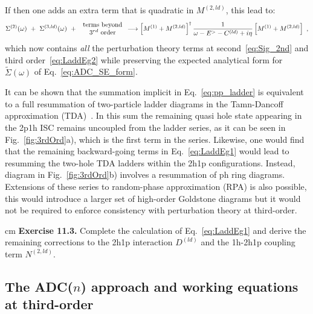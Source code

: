 If then one adds an extra term that is quadratic in  $M^{(2,ld)}$, this lead to:
\begin{equation}
  \Sigma^{(2)}(\omega)  ~+~ \Sigma^{(3, ld)}(\omega) ~+~ \begin{array}{c} \hbox{terms beyond} \\ \hbox{ 3$^{rd}$ order } \end{array} 
 \longrightarrow  \left[ M^{(1)} +  M^{(2,ld)}\right]^\dagger \frac1{\omega  - E^> - C^{(ld)} + i\eta}\left[ M^{(1)} + M^{(2,ld)}\right]  \ ,
 \label{eq:pp_ladder}
\end{equation}
which now contains {\em all}  the perturbation theory terms at second~\eqref{eq:Sig_2nd} and third order~\eqref{eq:LaddEg2} while preserving the expected analytical form for~$\widetilde\Sigma(\omega)$ of Eq.~\eqref{eq:ADC_SE_form}.

It can be shown that the summation implicit in Eq.~\eqref{eq:pp_ladder} is equivalent to a full resummation of two-particle ladder diagrams in the Tamn-Dancoff approximation (TDA)~\cite{ch11_RingSchuck}. In this sum the remaining quasi hole state appearing in the 2p1h ISC remains uncoupled from the ladder series, as it can be seen in Fig.~\ref{fig:3rdOrd}a), which is the first term in the series.  Likewise, one would find that the remaining backward-going terms in Eq.~\eqref{eq:LaddEg1} would lead to resumming the two-hole TDA ladders within the 2h1p configurations. Instead, diagram in Fig.~\ref{fig:3rdOrd}b) involves a resummation of ph ring diagrams. Extensions of these series to random-phase approximation (RPA) is also possible, this would introduce a larger set of high-order Goldstone diagrams but it would not be required to enforce consistency with perturbation theory at third-order.

 cm
\noindent
{\bf Exercise 11.3.}  Complete  the calculation of Eq.~\eqref{eq:LaddEg1} and derive the remaining corrections to the 2h1p interaction $D^{(ld)}$  and the 1h-2h1p coupling term  $N^{(2,ld)}$.


\subsection{The ADC($n$) approach and working equations at third-order}

